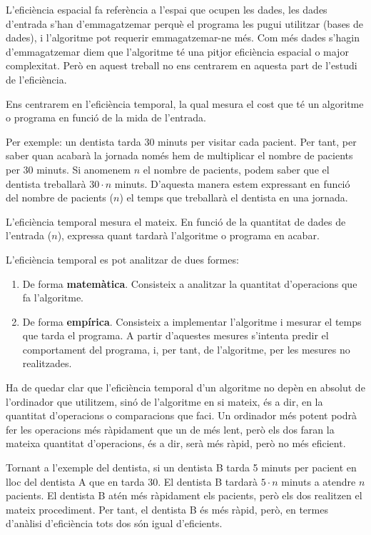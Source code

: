 L'eficiència espacial fa referència a l'espai que ocupen les dades, les dades d'entrada s'han d'emmagatzemar perquè el programa les pugui utilitzar (bases de dades), i l'algoritme pot requerir emmagatzemar-ne més. Com més dades s'hagin d'emmagatzemar diem que l'algoritme té una pitjor eficiència espacial o major complexitat. Però en aquest treball no ens centrarem en aquesta part de l'estudi de l'eficiència.

Ens centrarem en l'eficiència temporal, la qual mesura el cost que té un algoritme o programa en funció de la mida de l'entrada. 

Per exemple: un dentista tarda 30 minuts per visitar cada pacient. Per tant, per saber quan acabarà la jornada només hem de multiplicar el nombre de pacients per 30 minuts. Si anomenem $n$ el nombre de pacients, podem saber que el dentista treballarà $30 \cdot n$ minuts. D'aquesta manera estem expressant en funció del nombre de pacients ($n$) el temps que treballarà el dentista en una jornada.

L'eficiència temporal mesura el mateix. En funció de la quantitat de dades de l'entrada ($n$), expressa quant tardarà l'algoritme o programa en acabar.

L'eficiència temporal es pot analitzar de dues formes:
\begin{enumerate}
    \item De forma \textbf{matemàtica}. Consisteix a analitzar la quantitat d'operacions que fa l'algoritme.
    \item De forma \textbf{empírica}. Consisteix a implementar l'algoritme i mesurar el temps que tarda el programa. A partir d'aquestes mesures s'intenta predir el comportament del programa, i, per tant, de l'algoritme, per les mesures no realitzades.
\end{enumerate}

Ha de quedar clar que l'eficiència temporal d'un algoritme no depèn en absolut de l'ordinador que utilitzem, sinó de l'algoritme en si mateix, és a dir, en la quantitat d'operacions o comparacions que faci. Un ordinador més potent podrà fer les operacions més ràpidament que un de més lent, però els dos faran la mateixa quantitat d'operacions, és a dir, serà més ràpid, però no més eficient.

Tornant a l'exemple del dentista, si un dentista B tarda 5 minuts per pacient en lloc del dentista A que en tarda 30. El dentista B tardarà $5 \cdot n$ minuts a atendre $n$ pacients. El dentista B atén més ràpidament els pacients, però els dos realitzen el mateix procediment. Per tant, el dentista B és més ràpid, però, en termes d'anàlisi d'eficiència tots dos són igual d'eficients. 


